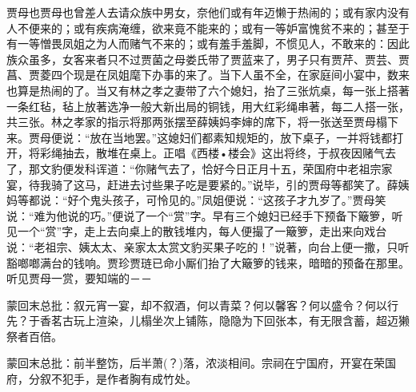 \begin{parag}
    贾母也贾母也曾差人去请众族中男女，奈他们或有年迈懒于热闹的；或有家内没有人不便来的；或有疾病淹缠，欲来竟不能来的；或有一等妒富愧贫不来的；甚至于有一等憎畏凤姐之为人而赌气不来的；或有羞手羞脚，不惯见人，不敢来的：因此族众虽多，女客来者只不过贾菌之母娄氏带了贾蓝来了，男子只有贾芹、贾芸、贾菖、贾菱四个现是在凤姐麾下办事的来了。当下人虽不全，在家庭间小宴中，数来也算是热闹的了。当又有林之孝之妻带了六个媳妇，抬了三张炕桌，每一张上搭著一条红毡，毡上放著选净一般大新出局的铜钱，用大红彩绳串著，每二人搭一张，共三张。林之孝家的指示将那两张摆至薛姨妈李婶的席下，将一张送至贾母榻下来。贾母便说：“放在当地罢。”这媳妇们都素知规矩的，放下桌子，一并将钱都打开，将彩绳抽去，散堆在桌上。正唱《西楼•楼会》这出将终，于叔夜因赌气去了，那文豹便发科诨道：“你赌气去了，恰好今日正月十五，荣国府中老祖宗家宴，待我骑了这马，赶进去讨些果子吃是要紧的。”说毕，引的贾母等都笑了。薛姨妈等都说：“好个鬼头孩子，可怜见的。”凤姐便说：“这孩子才九岁了。”贾母笑说：“难为他说的巧。”便说了一个“赏”字。早有三个媳妇已经手下预备下簸箩，听见一个“赏”字，走上去向桌上的散钱堆内，每人便撮了一簸箩，走出来向戏台说：“老祖宗、姨太太、亲家太太赏文豹买果子吃的！”说著，向台上便一撒，只听豁啷啷满台的钱响。贾珍贾琏已命小厮们抬了大簸箩的钱来，暗暗的预备在那里。听见贾母一赏，要知端的－－
\end{parag}


\begin{parag}
    \begin{note}蒙回末总批：叙元宵一宴，却不叙酒，何以青菜？何以馨客？何以盛令？何以行先？于香茗古玩上渲染，儿榻坐次上铺陈，隐隐为下回张本，有无限含蓄，超迈獭祭者百倍。\end{note}
\end{parag}


\begin{parag}
    \begin{note}蒙回末总批：前半整饬，后半萧(？)落，浓淡相间。宗祠在宁国府，开宴在荣国府，分叙不犯手，是作者胸有成竹处。\end{note}
\end{parag}
